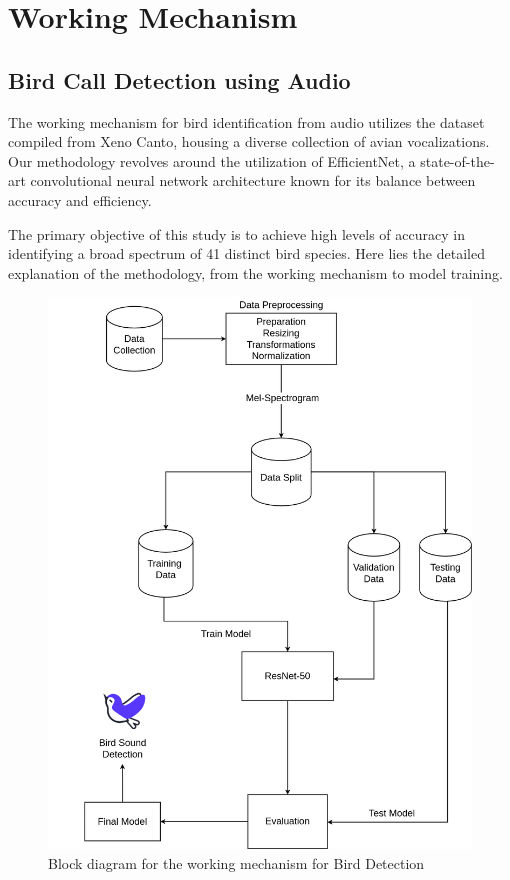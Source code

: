 \section{Working Mechanism}
\subsection{Bird Call Detection using Audio}
The working mechanism for bird identification from audio utilizes the dataset
compiled from Xeno Canto, housing a diverse collection of avian vocalizations.
Our methodology revolves around the utilization of EfficientNet, a
state-of-the-art convolutional neural network architecture known for its
balance between accuracy and efficiency.

The primary objective of this study is to achieve high levels of accuracy in
identifying a broad spectrum of 41 distinct bird species. Here lies the
detailed explanation of the methodology, from the working mechanism to model
training.
\begin{figure}[h!]
    \centering
    \includegraphics[scale=0.33]{images/DetectionMethodology.png}
    \caption{Block diagram for the working mechanism for Bird Detection}%
\end{figure}

